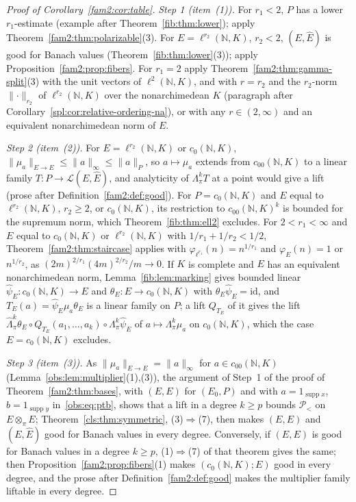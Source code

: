 \documentclass[11pt]{amsart}
\theoremstyle{definition}
\theoremstyle{remark}
\numberwithin{equation}{section}
\newcommand{\N}{\mathbb N}
\newcommand{\cL}{\mathcal L}
\newcommand{\id}{\mathrm{id}}
\newcommand{\norm}[1]{\lVert #1\rVert}
\theoremstyle{plain}
\theoremstyle{definition}
\theoremstyle{plain}
\newcommand{\hLambda}{\widehat\Lambda}
\newcommand{\cP}{\mathcal P}
\begin{document}
\begin{proof}[Proof of Corollary~\ref{fam2:cor:table}]
\emph{Step 1 (item~(1)).} For $r_1<2$, $P$ has a lower $r_1$-estimate (example after Theorem~\ref{fib:thm:lower}); apply
Theorem~\ref{fam2:thm:polarizable}(3). For $E=\ell^{r_2}(\N,K)$, $r_2<2$, $(E,\widehat E)$ is good for Banach values
(Theorem~\ref{fib:thm:lower}(3)); apply Proposition~\ref{fam2:prop:fibers}. For $r_1=2$ apply
Theorem~\ref{fam2:thm:gamma-split}(3) with the unit vectors of $\ell^2(\N,K)$, and with $r=r_2$ and the $r_2$-norm
$\norm\cdot_{r_2}$ of $\ell^{r_2}(\N,K)$ over the nonarchimedean $K$ (paragraph after
Corollary~\ref{spl:cor:relative-ordering-na}), or with any $r\in(2,\infty)$ and an equivalent nonarchimedean norm of $E$.

\emph{Step 2 (item~(2)).} For $E=\ell^{r_2}(\N,K)$ or $c_0(\N,K)$, $\norm{\mu_a}_{E\to E}\le\norm a_\infty\le\norm a_P$,
so $a\mapsto\mu_a$ extends from $c_{00}(\N,K)$ to a linear family $T\colon P\to\cL(E,\widehat E)$, and analyticity of
$\Lambda^k_\pi T$ at a point would give a lift (prose after Definition~\ref{fam2:def:good}). For $P=c_0(\N,K)$ and $E$
equal to $\ell^{r_2}(\N,K)$, $r_2\ge2$, or $c_0(\N,K)$, its restriction to $c_{00}(\N,K)^k$ is bounded for the supremum
norm, which Theorem~\ref{fib:thm:ell2} excludes. For $2<r_1<\infty$ and $E$ equal to $c_0(\N,K)$ or $\ell^{r_2}(\N,K)$ with
$1/r_1+1/r_2<1/2$, Theorem~\ref{fam2:thm:staircase} applies with $\varphi_{\ell^{r_1}}(n)=n^{1/r_1}$ and $\varphi_E(n)=1$
or $n^{1/r_2}$, as $(2m)^{2/r_1}(4m)^{2/r_2}/m\to0$. If $K$ is complete and $E$ has an equivalent nonarchimedean norm,
Lemma~\ref{fib:lem:marking} gives bounded linear $\widehat\psi_E\colon c_0(\N,K)\to E$ and $\theta_E\colon E\to c_0(\N,K)$
with $\theta_E\widehat\psi_E=\id$, and $T_E(a)=\widehat\psi_E\mu_a\theta_E$ is a linear family on $P$; a lift $Q_{T_E}$ of it
gives the lift $\hLambda^k_\pi\theta_E\circ Q_{T_E}(a_1,\dots,a_k)\circ\Lambda^k_\pi\widehat\psi_E$ of $a\mapsto
\Lambda^k_\pi\mu_a$ on $c_0(\N,K)$, which the case $E=c_0(\N,K)$ excludes.

\emph{Step 3 (item~(3)).} As $\norm{\mu_a}_{E\to E}=\norm a_\infty$ for $a\in c_{00}(\N,K)$
(Lemma~\ref{obs:lem:multiplier}(1),(3)), the argument of Step~1 of the proof of Theorem~\ref{fam2:thm:bases}, with $(E,E)$
for $(E_0,P)$ and with $a=1_{\operatorname{supp}x}$, $b=1_{\operatorname{supp}y}$ in~\eqref{obs:eq:ptb}, shows that a lift in
a degree $k\ge p$ bounds $\cP_<$ on $E\otimes_\pi E$; Theorem~\ref{cls:thm:symmetric}, (3)$\Rightarrow$(7), then makes
$(E,E)$ and $(E,\widehat E)$ good for Banach values in every degree. Conversely, if $(E,E)$ is
good for Banach values in a degree $k\ge p$, (1)$\Rightarrow$(7) of that theorem gives the same; then
Proposition~\ref{fam2:prop:fibers}(1) makes $(c_0(\N,K);E)$ good in every degree, and the prose after
Definition~\ref{fam2:def:good} makes the multiplier family liftable in every degree.
\end{proof}
\end{document}
